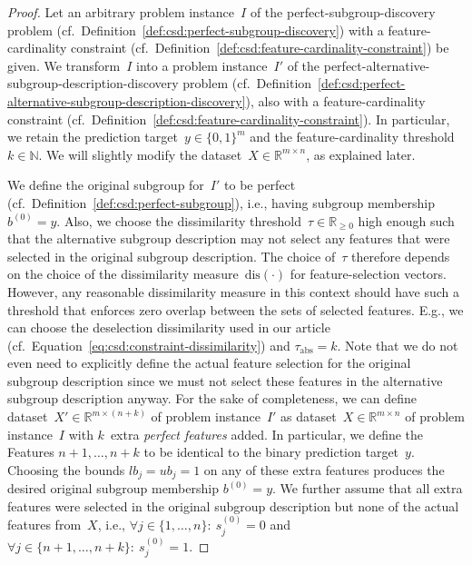 \documentclass{article}
\theoremstyle{definition}
\begin{document}
\begin{proof}
Let an arbitrary problem instance~$I$ of the perfect-subgroup-discovery problem (cf.~Definition~\ref{def:csd:perfect-subgroup-discovery}) with a feature-cardinality constraint (cf.~Definition~\ref{def:csd:feature-cardinality-constraint}) be given.	
We transform~$I$ into a problem instance~$I'$ of the perfect-alternative-subgroup-description-discovery problem (cf.~Definition~\ref{def:csd:perfect-alternative-subgroup-description-discovery}), also with a feature-cardinality constraint (cf.~Definition~\ref{def:csd:feature-cardinality-constraint}).
In particular, we retain the prediction target~$y \in \{0,1\}^m$ and the feature-cardinality threshold~$k \in \mathbb{N}$.
We will slightly modify the dataset~$X \in \mathbb{R}^{m \times n}$, as explained later.

We define the original subgroup for~$I'$ to be perfect (cf.~Definition~\ref{def:csd:perfect-subgroup}), i.e., having subgroup membership $b^{(0)} = y$.
Also, we choose the dissimilarity threshold~$\tau \in \mathbb{R}_{\geq 0}$ high enough such that the alternative subgroup description may not select any features that were selected in the original subgroup description.
The choice of~$\tau$ therefore depends on the choice of the dissimilarity measure~$\text{dis}(\cdot)$ for feature-selection vectors.
However, any reasonable dissimilarity measure in this context should have such a threshold that enforces zero overlap between the sets of selected features.
E.g., we can choose the deselection dissimilarity used in our article (cf.~Equation~\ref{eq:csd:constraint-dissimilarity}) and $\tau_{\text{abs}} = k$.
Note that we do not even need to explicitly define the actual feature selection for the original subgroup description since we must not select these features in the alternative subgroup description anyway.
For the sake of completeness, we can define dataset~$X' \in \mathbb{R}^{m \times (n+k)}$ of problem instance~$I'$ as dataset~$X \in \mathbb{R}^{m \times n}$ of problem instance~$I$ with $k$~extra \emph{perfect features} added.
In particular, we define the Features $n+1, \dots, n+k$ to be identical to the binary prediction target~$y$.
Choosing the bounds $\mathit{lb}_j = \mathit{ub}_j = 1$ on any of these extra features produces the desired original subgroup membership $b^{(0)} = y$.
We further assume that all extra features were selected in the original subgroup description but none of the actual features from~$X$, i.e., $\forall j \in \{1, \dots, n\}:~ s^{(0)}_j = 0$ and $\forall j \in \{n+1, \dots, n+k\}:~ s^{(0)}_j = 1$.


\end{proof}
\end{document}
